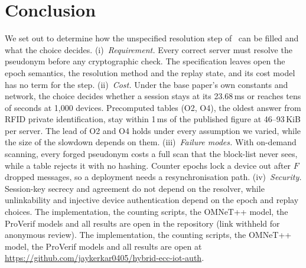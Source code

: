 \section{Conclusion}\label{sec:concl}
We set out to determine how the unspecified resolution step of~\cite{base} can be filled and what the choice decides.
(i)~\emph{Requirement.} Every correct server must resolve the pseudonym before any cryptographic check. The specification
leaves open the epoch semantics, the resolution method and the replay state, and its cost model has no term for the step.
(ii)~\emph{Cost.} Under the base paper's own constants and network, the choice decides whether a session stays at its
23.68\,ms or reaches tens of seconds at 1{,}000 devices. Precomputed tables (O2, O4), the oldest answer from RFID private
identification, stay within 1\,ms of the published figure at 46--93\,KiB per server. The lead of O2 and O4 holds under every
assumption we varied, while the size of the slowdown depends on them.
(iii)~\emph{Failure modes.} With on-demand scanning, every forged pseudonym costs a full scan that the block-list never
sees, while a table rejects it with no hashing. Counter epochs lock a device out after $F$ dropped messages, so a
deployment needs a resynchronisation path.
\iffv
(iv)~\emph{Security.} Session-key secrecy and agreement do not depend on the resolver, while unlinkability and injective
device authentication depend on the epoch and replay choices.
\fi
\ifanonymous
The implementation, the counting scripts, the OMNeT++ model\iffv, the ProVerif models\fi{} and all results are open in
the repository (link withheld for anonymous review).
\else
The implementation, the counting scripts, the OMNeT++ model\iffv, the ProVerif models\fi{} and all results are open at
\url{https://github.com/jaykerkar0405/hybrid-ecc-iot-auth}.
\fi

